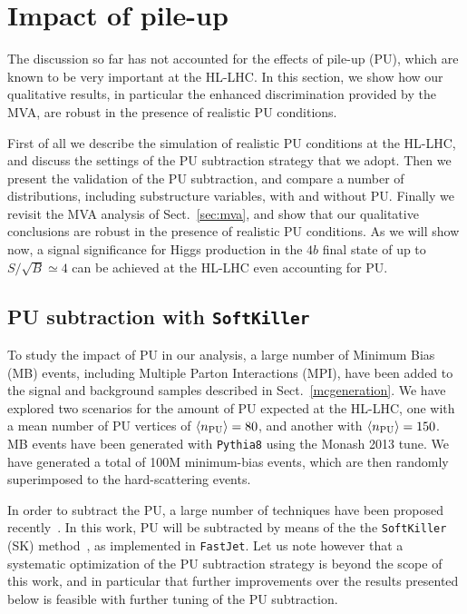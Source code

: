 
\section{Impact of pile-up}

\label{sec:pileup}

The discussion so far has not accounted for the effects of
pile-up (PU), which are known to be very important at the HL-LHC.
%
In this section, we show how our qualitative results, in particular
the enhanced discrimination provided by the MVA, are robust
in the presence of realistic PU conditions.


First of all we describe the simulation of realistic
PU conditions at the HL-LHC, and discuss the settings of
the PU subtraction strategy that we adopt.
%
Then we present the validation of the PU subtraction,
and compare a number of distributions, including substructure variables,
with and without PU.
%
Finally we revisit the MVA analysis of Sect.~\ref{sec:mva}, and
show that our qualitative conclusions are robust
in the presence of realistic PU conditions.
%
As we will show now, a signal significance for
Higgs production in the $4b$ final state
of up to $S/\sqrt{B}\simeq 4$
can be achieved at the HL-LHC even accounting for PU.


\subsection{PU subtraction with {\tt SoftKiller}}

To study the impact of PU in our analysis,
a large number
of Minimum Bias (MB) events,
including Multiple Parton Interactions (MPI),
have been added to the signal
and background samples described in Sect.~\ref{mcgeneration}.
%
We have explored two scenarios for the amount of PU expected
at the HL-LHC, one with a mean number of
PU vertices of $\left\langle n_{\rm PU}\right\rangle=80$, and another
with $\left\langle n_{\rm PU}\right\rangle=150$.
%
MB events have been generated with {\tt Pythia8} using
the Monash 2013 tune.
%
We have generated a total of 100M minimum-bias events, which are
then randomly superimposed to the hard-scattering events.

In order to subtract the PU, a large number of techniques
have been proposed recently~\cite{Cacciari:2009dp,TheATLAScollaboration:2013pia,Butterworth:2008iy,Cacciari:2007fd,Krohn:2009th,Krohn:2013lba,Ellis:2009me,Bertolini:2014bba,Cacciari:2014gra,Cacciari:2014jta,Berta:2014eza,Larkoski:2014wba}.
%
In this work, PU  will be subtracted by means
of the the {\tt SoftKiller} (SK)
method~\cite{Cacciari:2014gra}, as implemented in {\tt FastJet}.
%
Let us note however that
a systematic optimization of the PU subtraction strategy is beyond
the scope of this work, and in particular that further
improvements over the results presented below is feasible
with further tuning of the PU subtraction.


